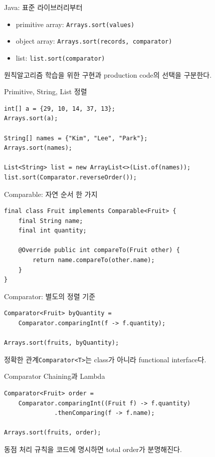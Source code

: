 \begin{frame}{Java: 표준 라이브러리부터}
\begin{itemize}\item primitive array: \texttt{Arrays.sort(values)}\item object array: \texttt{Arrays.sort(records, comparator)}\item list: \texttt{list.sort(comparator)}\end{itemize}
\begin{block}{원칙}알고리즘 학습을 위한 구현과 production code의 선택을 구분한다.\end{block}
\end{frame}
\begin{frame}[fragile]{Primitive, String, List 정렬}
\begin{lstlisting}[style=jcode]
int[] a = {29, 10, 14, 37, 13};
Arrays.sort(a);

String[] names = {"Kim", "Lee", "Park"};
Arrays.sort(names);

List<String> list = new ArrayList<>(List.of(names));
list.sort(Comparator.reverseOrder());
\end{lstlisting}
\end{frame}
\begin{frame}[fragile]{Comparable: 자연 순서 한 가지}
\optional[선택 심화]\hfill
\begin{lstlisting}[style=jcode]
final class Fruit implements Comparable<Fruit> {
    final String name;
    final int quantity;

    @Override public int compareTo(Fruit other) {
        return name.compareTo(other.name);
    }
}
\end{lstlisting}
\end{frame}
\begin{frame}[fragile]{Comparator: 별도의 정렬 기준}
\begin{lstlisting}[style=jcode]
Comparator<Fruit> byQuantity =
    Comparator.comparingInt(f -> f.quantity);

Arrays.sort(fruits, byQuantity);
\end{lstlisting}
\begin{block}{정확한 관계}\texttt{Comparator<T>}는 class가 아니라 \alert{functional interface}다.\end{block}
\end{frame}
\begin{frame}[fragile]{Comparator Chaining과 Lambda}
\begin{lstlisting}[style=jcode]
Comparator<Fruit> order =
    Comparator.comparingInt((Fruit f) -> f.quantity)
              .thenComparing(f -> f.name);

Arrays.sort(fruits, order);
\end{lstlisting}
동점 처리 규칙을 코드에 명시하면 total order가 분명해진다.
\vfill{}
\end{frame}
